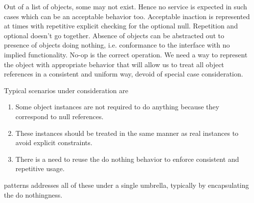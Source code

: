 \vspace{3mm}

Out of a list of objects, some may not exist. Hence no service is expected in such cases which can be an acceptable behavior too. Acceptable inaction is represented at times with repetitive explicit checking for the optional null. Repetition and optional doesn't go together. Absence of objects can be abstracted out to presence of objects doing nothing, i.e. conformance to the interface with no implied functionality. No-op is the correct operation. We need a way to represent the object with appropriate behavior that will allow us to treat all object references in a consistent and uniform way, devoid of special case consideration.

Typical scenarios under consideration are
\begin{enumerate}[topsep=0em, itemsep=0.2em]
\item Some object instances are not required to do anything because they correspond to null references.
\item These instances should be treated in the same manner as real instances to avoid explicit constraints.
\item There is a need to reuse the do nothing behavior to enforce consistent and repetitive usage.
\end{enumerate}

 patterns addresses all of these under a single umbrella, typically by encapsulating the do nothingness.






